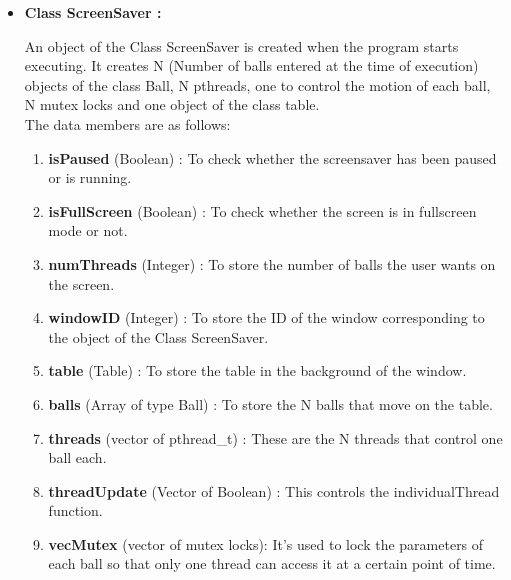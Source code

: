 \documentclass[]{article}
\begin{document}
\begin{itemize}
\item \textbf{Class ScreenSaver :}
\begin{flushleft}
An object of the Class ScreenSaver is created when the program starts executing. It creates N (Number of balls entered at the time of execution) objects of the class Ball, N pthreads, one to control the motion of each ball, N mutex locks and one object of the class table. \\
The data members are as follows: \\
\begin{enumerate}
\item \textbf{isPaused} (Boolean) : To check whether the screensaver has been paused or is running.
\item \textbf{isFullScreen} (Boolean) : To check whether the screen is in fullscreen mode or not.
\item \textbf{numThreads} (Integer) : To store the number of balls the user wants on the screen.
\item \textbf{windowID} (Integer) : To store the ID of the window corresponding to the object of the Class ScreenSaver.
\item \textbf{table} (Table) : To store the table in the background of the window.
\item \textbf{balls} (Array of type Ball) : To store the N balls that move on the table.
\item \textbf{threads} (vector of pthread\_t) : These are the N threads that control one ball each.
\item \textbf{threadUpdate} (Vector of Boolean) : This controls the individualThread function.
\item \textbf{vecMutex} (vector of mutex locks): It's used to lock the parameters of each ball so that only one thread can access it at a certain point of time. 
\end{enumerate}


\end{flushleft}
\end{itemize}
\end{document}
